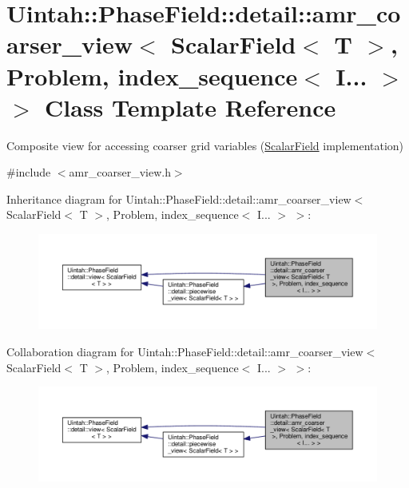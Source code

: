 \hypertarget{classUintah_1_1PhaseField_1_1detail_1_1amr__coarser__view_3_01ScalarField_3_01T_01_4_00_01Proble9cadea116dab5bdb44bb3e29abbe99ef}{}\section{Uintah\+:\+:Phase\+Field\+:\+:detail\+:\+:amr\+\_\+coarser\+\_\+view$<$ Scalar\+Field$<$ T $>$, Problem, index\+\_\+sequence$<$ I... $>$ $>$ Class Template Reference}
\label{classUintah_1_1PhaseField_1_1detail_1_1amr__coarser__view_3_01ScalarField_3_01T_01_4_00_01Proble9cadea116dab5bdb44bb3e29abbe99ef}


Composite view for accessing coarser grid variables (\hyperlink{structUintah_1_1PhaseField_1_1ScalarField}{Scalar\+Field} implementation)  




{\ttfamily \#include $<$amr\+\_\+coarser\+\_\+view.\+h$>$}



Inheritance diagram for Uintah\+:\+:Phase\+Field\+:\+:detail\+:\+:amr\+\_\+coarser\+\_\+view$<$ Scalar\+Field$<$ T $>$, Problem, index\+\_\+sequence$<$ I... $>$ $>$\+:\nopagebreak
\begin{figure}[H]
\begin{center}
\leavevmode
\includegraphics[width=350pt]{classUintah_1_1PhaseField_1_1detail_1_1amr__coarser__view_3_01ScalarField_3_01T_01_4_00_01Proble06512f6d13005d234184897dae96b0e0}
\end{center}
\end{figure}


Collaboration diagram for Uintah\+:\+:Phase\+Field\+:\+:detail\+:\+:amr\+\_\+coarser\+\_\+view$<$ Scalar\+Field$<$ T $>$, Problem, index\+\_\+sequence$<$ I... $>$ $>$\+:\nopagebreak
\begin{figure}[H]
\begin{center}
\leavevmode
\includegraphics[width=350pt]{classUintah_1_1PhaseField_1_1detail_1_1amr__coarser__view_3_01ScalarField_3_01T_01_4_00_01Problea20917c4205b43c76a94539da984f2bf}
\end{center}
\end{figure}
